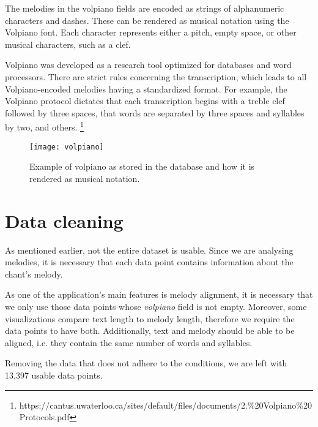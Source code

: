 The melodies in the volpiano fields are encoded as strings of alphanumeric characters and dashes. These can be rendered as musical notation using
the Volpiano font. Each character represents either a pitch, empty space, or other musical characters, such as a clef.

Volpiano was developed as a research tool optimized for databases and word processors. There are strict rules concerning the transcription, which leads
to all Volpiano-encoded melodies having a standardized format. For example, the Volpiano protocol dictates that each transcription begins with
a treble clef followed by three spaces, that words are separated by three spaces and syllables by two, and others.
\footnote{https://cantus.uwaterloo.ca/sites/default/files/documents/2.\%20Volpiano\%20Protocols.pdf}

\begin{figure}[h]
\centering
\texttt{[image: volpiano]}
\caption{Example of volpiano as stored in the database and how it is rendered as musical notation. \cite[Figure~2]{cantus_lacoste}}
\end{figure}

\section{Data cleaning}

As mentioned earlier, not the entire dataset is usable. Since we are analysing melodies, it is necessary that each data point contains information
about the chant's melody.

As one of the application's main features is melody alignment, it is necessary that we only use those data points whose \emph{volpiano} field is
not empty. Moreover, some visualizations compare text length to melody length, therefore we require the data points to have both. Additionally, 
text and melody should be able to be aligned, i.e. they contain the same number of words and syllables.

Removing the data that does not adhere to the conditions, we are left with 13,397 usable data points.

